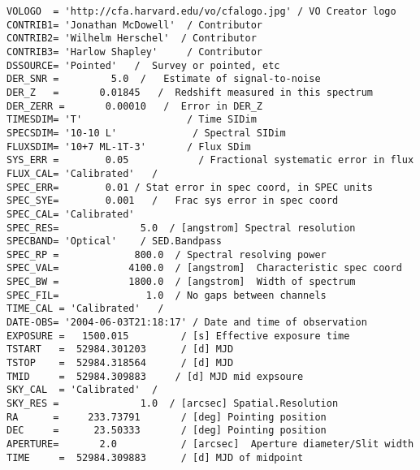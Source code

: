 {\begin{verbatim}
VOLOGO  = 'http://cfa.harvard.edu/vo/cfalogo.jpg' / VO Creator logo
CONTRIB1= 'Jonathan McDowell'  / Contributor
CONTRIB2= 'Wilhelm Herschel'  / Contributor
CONTRIB3= 'Harlow Shapley'     / Contributor
DSSOURCE= 'Pointed'   /  Survey or pointed, etc
DER_SNR =         5.0  /   Estimate of signal-to-noise
DER_Z   =       0.01845   /  Redshift measured in this spectrum
DER_ZERR =       0.00010   /  Error in DER_Z
TIMESDIM= 'T'                  / Time SIDim 
SPECSDIM= '10-10 L'             / Spectral SIDim
FLUXSDIM= '10+7 ML-1T-3'       / Flux SDim
SYS_ERR =        0.05            / Fractional systematic error in flux
FLUX_CAL= 'Calibrated'   /
SPEC_ERR=        0.01 / Stat error in spec coord, in SPEC units
SPEC_SYE=        0.001   /   Frac sys error in spec coord
SPEC_CAL= 'Calibrated'
SPEC_RES=              5.0  / [angstrom] Spectral resolution
SPECBAND= 'Optical'    / SED.Bandpass
SPEC_RP =             800.0  / Spectral resolving power
SPEC_VAL=            4100.0  / [angstrom]  Characteristic spec coord
SPEC_BW =            1800.0  / [angstrom]  Width of spectrum
SPEC_FIL=               1.0  / No gaps between channels
TIME_CAL = 'Calibrated'   /
DATE-OBS= '2004-06-03T21:18:17' / Date and time of observation
EXPOSURE =   1500.015         / [s] Effective exposure time
TSTART   =  52984.301203      / [d] MJD
TSTOP    =  52984.318564      / [d] MJD
TMID     =  52984.309883     / [d] MJD mid expsoure
SKY_CAL  = 'Calibrated'  /
SKY_RES =              1.0  / [arcsec] Spatial.Resolution
RA      =     233.73791       / [deg] Pointing position
DEC     =      23.50333       / [deg] Pointing position
APERTURE=       2.0           / [arcsec]  Aperture diameter/Slit width
TIME     =  52984.309883      / [d] MJD of midpoint



\end{verbatim}}
